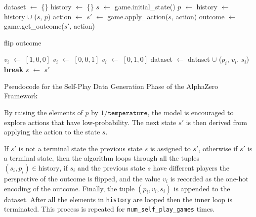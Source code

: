 \begin{algorithm}[H]
    \begin{algorithmic}[1]
            \State dataset $\gets$ \{\}
            \Repeat
            \State history $\gets$ \{\}
            \State $s$ $\gets$ game.initial\_state()
            \Loop
                \State $p$ $\gets$ 
                \State history $\gets$ history $\cup$ ($s$, $p$)
                \State action $\gets$ 
                \State $s'$ $\gets$ game.apply\_action($s$, action)
                        \State outcome $\gets$ game.get\_outcome($s'$, action)

                          \State flip outcome
                        \EndIf

                          \State $v_i$ $\gets$ $[1, 0, 0]$
                          \State $v_i$ $\gets$ $[0, 0, 1]$
                          \State $v_i$ $\gets$ $[0, 1, 0]$
                        \EndIf
                        \State dataset $\gets$ dataset $\cup$ ($p_i$, $v_i$, $s_i$)
                    \EndFor
                    \State \textbf{break}
                \EndIf
                \State $s$ $\gets$ $s'$
            \EndLoop
        \State {}
        \EndFunction
    \end{algorithmic}
    \caption{Pseudocode for the Self-Play Data Generation Phase of the AlphaZero Framework}
    \label{alg:data-generation}
\end{algorithm}

By raising the elements of $p$ by $1/\texttt{temperature}$, the model is encouraged to explore actions that have low-probability. The next state $s'$ is then derived from applying the action to the state $s$. 

If $s'$ is not a terminal state the previous state $s$ is assigned to $s'$, otherwise if $s'$ is a terminal state, then the algorithm loops through all the tuples $(s_i, p_i) \in \text{history}$, if $s_i$ and the previous state $s$ have different players the perspective of the outcome is flipped, and the value $v_i$ is recorded as the one-hot encoding of the outcome. Finally, the tuple $(p_i, v_i, s_i)$ is appended to the dataset. After all the elements in \texttt{history} are looped then the inner loop is terminated. This process is repeated for \texttt{num\_self\_play\_games} times.


